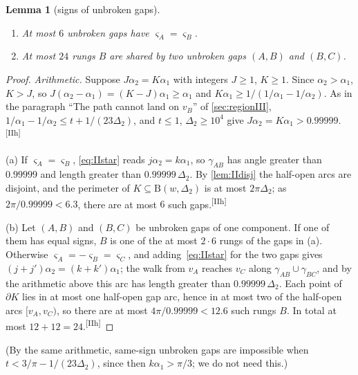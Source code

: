 \documentclass[11pt]{amsart}
\newtheorem{lemma}[theorem]{Lemma}
\theoremstyle{definition}
\theoremstyle{remark}
\newcommand{\Dt}{\Delta_2}
\newcommand{\Dd}{\mathrm{B}}      %
\newcommand{\chk}[1]{\textsuperscript{[#1]}}
\begin{document}
\begin{lemma}[signs of unbroken gaps]\label{lem:IIcons}
\begin{enumerate}[label=\textup{(\alph*)}]
\item At most $6$ unbroken gaps have $\varsigma_A=\varsigma_B$.
\item At most $24$ rungs $B$ are shared by two unbroken gaps $(A,B)$ and $(B,C)$.
\end{enumerate}
\end{lemma}
\begin{proof}
\emph{Arithmetic.} Suppose $J\alpha_2=K\alpha_1$ with integers $J\ge1$, $K\ge1$. Since $\alpha_2>\alpha_1$, $K>J$, so $J(\alpha_2-\alpha_1)=(K-J)\alpha_1\ge\alpha_1$ and $K\alpha_1\ge1/(1/\alpha_1-1/\alpha_2)$. As in the paragraph ``The path cannot land on $v_B$'' of \cref{sec:regionIII}, $1/\alpha_1-1/\alpha_2\le t+1/(23\Dt)$, and $t\le1$, $\Dt\ge10^4$ give $J\alpha_2=K\alpha_1>0.99999$.\chk{IIh}

(a) If $\varsigma_A=\varsigma_B$, \eqref{eq:IIstar} reads $j\alpha_2=k\alpha_1$, so $\gamma_{AB}$ has angle greater than $0.99999$ and length greater than $0.99999\,\Dt$. By \cref{lem:IIdisj} the half-open arcs are disjoint, and the perimeter of $K\subseteq\Dd(w,\Dt)$ is at most $2\pi\Dt$; as $2\pi/0.99999<6.3$, there are at most $6$ such gaps.\chk{IIh}

(b) Let $(A,B)$ and $(B,C)$ be unbroken gaps of one component. If one of them has equal signs, $B$ is one of the at most $2\cdot6$ rungs of the gaps in (a). Otherwise $\varsigma_A=-\varsigma_B=\varsigma_C$, and adding~\eqref{eq:IIstar} for the two gaps gives $(j+j')\alpha_2=(k+k')\alpha_1$; the walk from $v_A$ reaches $v_C$ along $\gamma_{AB}\cup\gamma_{BC}$, and by the arithmetic above this arc has length greater than $0.99999\,\Dt$. Each point of $\partial K$ lies in at most one half-open gap arc, hence in at most two of the half-open arcs $[v_A,v_C)$, so there are at most $4\pi/0.99999<12.6$ such rungs $B$. In total at most $12+12=24$.\chk{IIh}
\end{proof}
(By the same arithmetic, same-sign unbroken gaps are impossible when $t<3/\pi-1/(23\Dt)$, since then $k\alpha_1>\pi/3$; we do not need this.)
\end{document}
